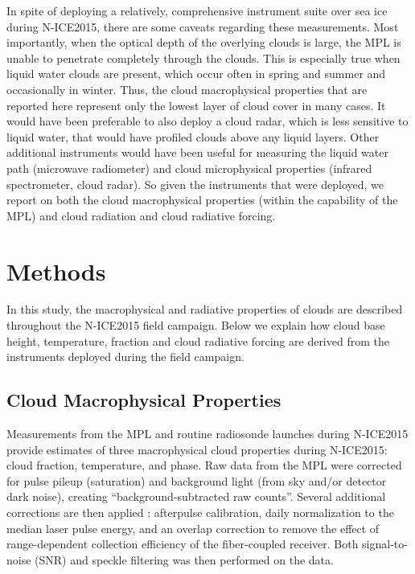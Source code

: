 In spite of deploying a relatively, comprehensive instrument suite over sea ice during N-ICE2015, there are some caveats regarding these measurements. Most importantly, when the optical depth of the overlying clouds is large, the MPL is unable to penetrate completely through the clouds. This is especially true when liquid water clouds are present, which occur often in spring and summer and occasionally in winter. Thus, the cloud macrophysical properties that are reported here represent only the lowest layer of cloud cover in many cases. It would have been preferable to also deploy a cloud radar, which is less sensitive to liquid water, that would have profiled clouds above any liquid layers. Other additional instruments would have been useful for measuring the liquid water path (microwave radiometer) and cloud microphysical properties (infrared spectrometer, cloud radar). So given the instruments that were deployed, we report on both the cloud macrophysical properties (within the capability of the MPL) and cloud radiation and cloud radiative forcing. 


\section{Methods}

In this study, the macrophysical and radiative properties of clouds are described throughout the N-ICE2015 field campaign. Below we explain how cloud base height, temperature, fraction and cloud radiative forcing are derived from the instruments deployed during the field campaign.

\subsection{Cloud Macrophysical Properties}
Measurements from the MPL and routine radiosonde launches during N-ICE2015 provide estimates of three macrophysical cloud properties during N-ICE2015: cloud fraction, temperature, and phase. Raw data from the MPL were corrected for pulse pileup (saturation) and background light (from sky and/or detector dark noise), creating “background-subtracted raw counts”. Several additional corrections are then applied \citep{campbell:2002, micropulse:2006}: afterpulse calibration, daily normalization to the median laser pulse energy, and an overlap correction to remove the effect of range-dependent collection efficiency of the fiber-coupled receiver. Both signal-to-noise (SNR) and speckle filtering was then performed on the data.

